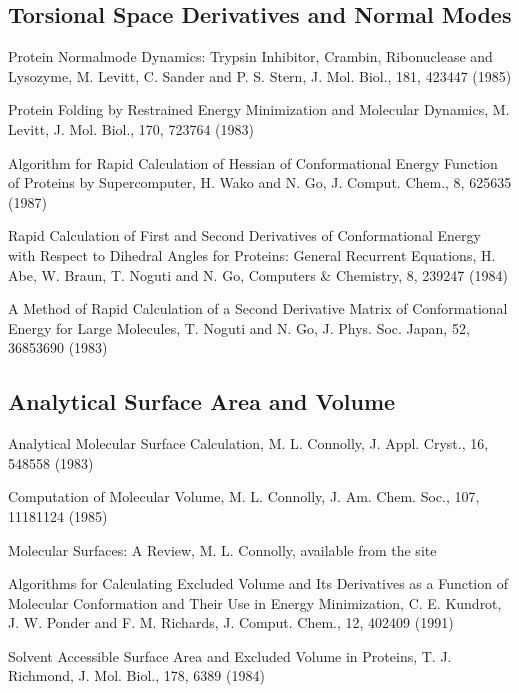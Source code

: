 \documentclass[letterpaper,11pt,english]{sphinxmanual}
\begin{document}
\subsection{Torsional Space Derivatives and Normal Modes}
\label{\detokenize{text/references:torsional-space-derivatives-and-normal-modes}}
Protein Normal\sphinxhyphen{}mode Dynamics:  Trypsin Inhibitor, Crambin, Ribonuclease and Lysozyme, M. Levitt, C. Sander and P. S. Stern, J. Mol. Biol., 181, 423\sphinxhyphen{}447 (1985)

Protein Folding by Restrained Energy Minimization and Molecular Dynamics, M. Levitt, J. Mol. Biol., 170, 723\sphinxhyphen{}764 (1983)

Algorithm for Rapid Calculation of Hessian of Conformational Energy Function of Proteins by Supercomputer, H. Wako and N. Go, J. Comput. Chem., 8, 625\sphinxhyphen{}635 (1987)

Rapid Calculation of First and Second Derivatives of Conformational Energy with Respect to Dihedral Angles for Proteins: General Recurrent Equations, H. Abe, W. Braun, T. Noguti and N. Go, Computers \& Chemistry, 8, 239\sphinxhyphen{}247 (1984)

A Method of Rapid Calculation of a Second Derivative Matrix of Conformational Energy for Large Molecules, T. Noguti and N. Go, J. Phys. Soc. Japan, 52, 3685\sphinxhyphen{}3690 (1983)


\subsection{Analytical Surface Area and Volume}
\label{\detokenize{text/references:analytical-surface-area-and-volume}}
Analytical Molecular Surface Calculation, M. L. Connolly, J. Appl. Cryst., 16, 548\sphinxhyphen{}558 (1983)

Computation of Molecular Volume, M. L. Connolly, J. Am. Chem. Soc., 107, 1118\sphinxhyphen{}1124 (1985)

Molecular Surfaces: A Review, M. L. Connolly, available from the site 

Algorithms for Calculating Excluded Volume and Its Derivatives as a Function of Molecular Conformation and Their Use in Energy Minimization, C. E. Kundrot, J. W. Ponder and F. M. Richards, J. Comput. Chem., 12, 402\sphinxhyphen{}409 (1991)

Solvent Accessible Surface Area and Excluded Volume in Proteins, T. J. Richmond, J. Mol. Biol., 178, 63\sphinxhyphen{}89 (1984)
\end{document}
